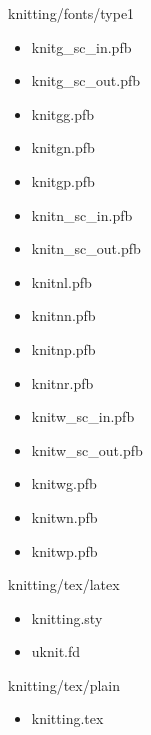 \documentclass[draft]{amsart}
\begin{document}
\noindent knitting/fonts/type1
\begin{itemize}
    \item knitg_sc_in.pfb
    \item knitg_sc_out.pfb
    \item knitgg.pfb
    \item knitgn.pfb
    \item knitgp.pfb
    \item knitn_sc_in.pfb
    \item knitn_sc_out.pfb
    \item knitnl.pfb
    \item knitnn.pfb
    \item knitnp.pfb
    \item knitnr.pfb
    \item knitw_sc_in.pfb
    \item knitw_sc_out.pfb
    \item knitwg.pfb
    \item knitwn.pfb
    \item knitwp.pfb
\end{itemize}

\noindent knitting/tex/latex
\begin{itemize}
    \item knitting.sty
    \item uknit.fd
\end{itemize}
\noindent knitting/tex/plain
\begin{itemize}
    \item knitting.tex
\end{itemize}

\endgroup
\end{document}
